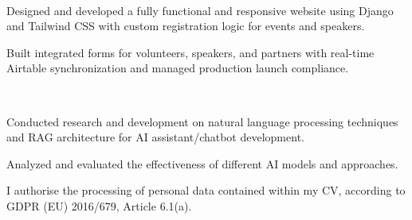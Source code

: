 \documentclass[]{deedy-resume-openfont}
\begin{document}
\begin{minipage}[t]{0.55\textwidth}
 \\
\vspace{\topsep} %
\begin{tightemize}
\item Designed and developed a fully functional and responsive website using Django and Tailwind CSS with custom registration logic for events and speakers.
\item Built integrated forms for volunteers, speakers, and partners with real-time Airtable synchronization and managed production launch compliance.
\end{tightemize}
\sectionsep

 \\
\vspace{\topsep} %
\begin{tightemize}
\item Conducted research and development on natural language processing techniques and RAG architecture for AI assistant/chatbot development.
\item Analyzed and evaluated the effectiveness of different AI models and approaches.
\end{tightemize}
\sectionsep




\end{minipage} 

\vfill %
\begin{center}
    \scriptsize %
    I authorise the processing of personal data contained within my CV, according to GDPR (EU) 2016/679, Article 6.1(a).
\end{center}
\end{document}

